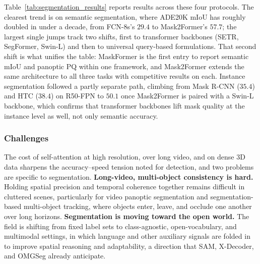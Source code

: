 Table~\ref{tab:segmentation_results} reports results across these four protocols. The clearest trend is on semantic segmentation, where ADE20K mIoU has roughly doubled in under a decade, from FCN-8s's $29.4$ to Mask2Former's $57.7$; the largest single jumps track two shifts, first to transformer backbones (SETR, SegFormer, Swin-L) and then to universal query-based formulations. That second shift is what unifies the table: MaskFormer is the first entry to report semantic mIoU and panoptic PQ within one framework, and Mask2Former extends the same architecture to all three tasks with competitive results on each. Instance segmentation followed a partly separate path, climbing from Mask R-CNN ($35.4$) and HTC ($38.4$) on R50-FPN to $50.1$ once Mask2Former is paired with a Swin-L backbone, which confirms that transformer backbones lift mask quality at the instance level as well, not only semantic accuracy.


\subsubsection{Challenges}
The cost of self-attention at high resolution, over long video, and on dense 3D data sharpens the accuracy--speed tension noted for detection, and two problems are specific to segmentation.
\textbf{Long-video, multi-object consistency is hard.} Holding spatial precision and temporal coherence together remains difficult in cluttered scenes, particularly for video panoptic segmentation and segmentation-based multi-object tracking, where objects enter, leave, and occlude one another over long horizons.
\textbf{Segmentation is moving toward the open world.} The field is shifting from fixed label sets to class-agnostic, open-vocabulary, and multimodal settings, in which language and other auxiliary signals are folded in to improve spatial reasoning and adaptability, a direction that SAM, X-Decoder, and OMGSeg already anticipate.



